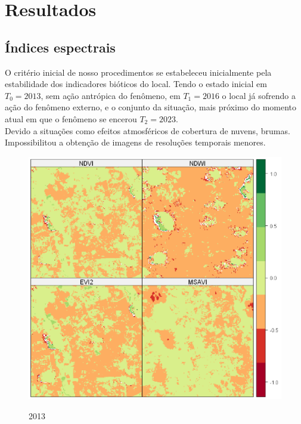 
\section{ Resultados }
 
 \subsection{Índices espectrais}
 
\hspace*{1.25 cm} O critério inicial de nosso procedimentos se estabeleceu inicialmente pela estabilidade dos indicadores bióticos do local. Tendo o  estado inicial em $ T_{0} =  2013$, sem ação antrópica do fenômeno, em $T _{1} =  2016$ o local já sofrendo a ação do fenômeno externo, e o conjunto da situação, mais próximo do momento atual em que o fenômeno se encerou $T _{2} =  2023$. \\
\hspace*{1.25 cm} Devido a situações como efeitos atmosféricos de  cobertura de nuvens, brumas. Impossibilitou a obtenção de imagens de resoluções temporais menores.\\ 
 			\begin{minipage}[t!]{0.31\textwidth}
 				\begin{figure}[H]
 					\centering \small \caption{2013}
 					\includegraphics[width=0.97\linewidth]{FIGURAS/indices20131023}
 					\label{fig:ima2013} 
 				\end{figure}			
 				
 			\end{minipage}\hfill
